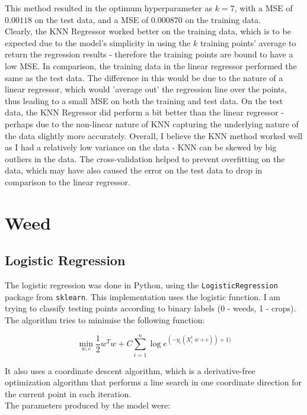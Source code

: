 \documentclass{scrartcl}
\begin{document}
This method resulted in the optimum hyperparameter as $k = 7$, with a MSE of $0.00118$ on the test data, and a MSE of $0.000870$ on the training data. \\

Clearly, the KNN Regressor worked better on the training data, which is to be expected due to the model's simplicity in using the $k$ training points' average to return the regression results - therefore the training points are bound to have a low MSE. In comparison, the training data in the linear regressor performed the same as the test data. The difference in this would be due to the nature of a linear regressor, which would 'average out' the regression line over the points, thus leading to a small MSE on both the training and test data. On the test data, the KNN Regressor did perform a bit better than the linear regressor - perhaps due to the non-linear nature of KNN capturing the underlying nature of the data slightly more accurately. Overall, I believe the KNN method worked well as I had a relatively low variance on the data - KNN can be skewed by big outliers in the data. The cross-validation helped to prevent overfitting on the data, which may have also caused the error on the test data to drop in comparison to the linear regressor.

\newpage
\section{Weed}

\subsection{Logistic Regression}
The logistic regression was done in Python, using the \texttt{LogisticRegression} package from \texttt{sklearn}. This implementation uses the logistic function. I am trying to classify testing points according to binary labels (0 - weeds, 1 - crops). The algorithm tries to minimise the following function:

\[ \min_{w, c} \frac{1} {2} w^T w + C \sum^n_{i=1} \log e ^{(-y_i(X^t_i \; w + c)) +1)} \]

It also uses a coordinate descent algorithm, which is a derivative-free optimization algorithm that performs a line search in one coordinate direction for the current point in each iteration. \cite{wiki:cd} \\

The parameters produced by the model were:
\end{document}

